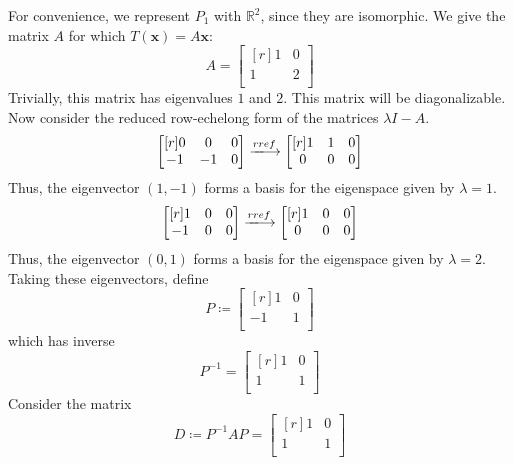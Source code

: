 \documentclass{article}
\theoremstyle{definition}
\newenvironment{solution}[1][]{\begin{replacementsoln}}{\end{replacementsoln}}
\begin{document}
\begin{solution}
  For convenience, we represent \(P_1\) with \(\mathbb{R}^2\), since they are isomorphic. We give the matrix \(A\) for which \(T(\mathbf{x})=A \mathbf{x}\):
  \[
    A= \begin{bmatrix}[r]
       1&0   \\
       1& 2  \\
    \end{bmatrix}
  \]
  Trivially, this matrix has eigenvalues \(1\) and \(2\). This matrix will be diagonalizable. Now consider the reduced row-echelong form of the matrices \(\lambda I - A\).
  \[
    \begin{bmatrix}[r]
      0 &0  &0   \\
       -1&-1  &0   \\
    \end{bmatrix}\xlongrightarrow{rref} \begin{bmatrix}[r]
      1 &1&0   \\
       0& 0&0  \\
    \end{bmatrix}
  \]
  Thus, the eigenvector \((1,-1)\) forms a basis for the eigenspace given by \(\lambda =1\).
  \[
    \begin{bmatrix}[r]
      1 &0  &0   \\
       -1&0  &0   \\
    \end{bmatrix} \xlongrightarrow{rref} \begin{bmatrix}[r]
      1 &0&0   \\
       0&0&0   \\
    \end{bmatrix}
  \]
  Thus, the eigenvector \((0,1)\) forms a basis for the eigenspace given by \(\lambda =2\). Taking these eigenvectors, define
  \[
    P\coloneqq \begin{bmatrix}[r]
      1 & 0  \\
      -1 & 1  \\
    \end{bmatrix}
  \]
  which has inverse
  \[
    P ^{-1} = \begin{bmatrix}[r]
      1 &0   \\
       1&1   \\
    \end{bmatrix}
  \]
  Consider the matrix
  \[
    D\coloneqq P ^{-1} AP = \begin{bmatrix}[r]
      1 &0   \\
       1&1   \\

\end{bmatrix}\]
\end{solution}
\end{document}
